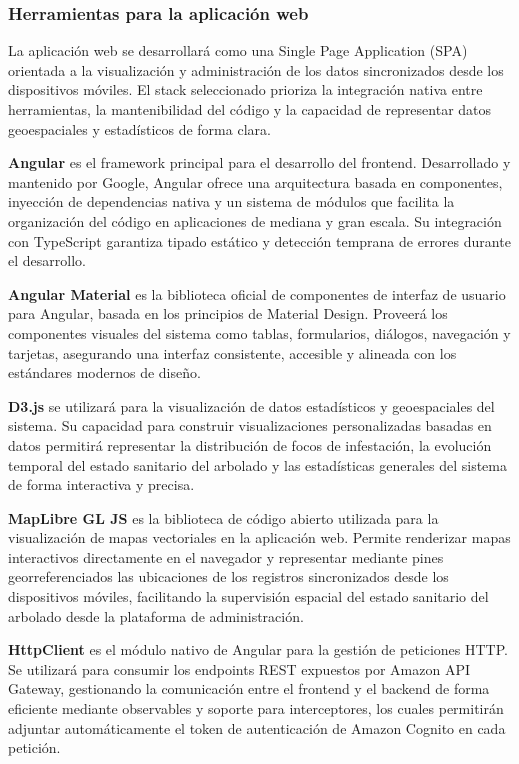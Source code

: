 \newpage
\subsubsection{Herramientas para la aplicación web}

La aplicación web se desarrollará como una Single Page Application
(SPA) orientada a la visualización y administración de los datos
sincronizados desde los dispositivos móviles. El stack seleccionado
prioriza la integración nativa entre herramientas, la mantenibilidad
del código y la capacidad de representar datos geoespaciales y
estadísticos de forma clara.

\textbf{Angular} es el framework principal para el desarrollo del
frontend. Desarrollado y mantenido por Google, Angular ofrece una
arquitectura basada en componentes, inyección de dependencias nativa
y un sistema de módulos que facilita la organización del código en
aplicaciones de mediana y gran escala. Su integración con TypeScript
garantiza tipado estático y detección temprana de errores durante
el desarrollo.

\textbf{Angular Material} es la biblioteca oficial de componentes
de interfaz de usuario para Angular, basada en los principios de
Material Design. Proveerá los componentes visuales del sistema como
tablas, formularios, diálogos, navegación y tarjetas, asegurando
una interfaz consistente, accesible y alineada con los estándares
modernos de diseño.

\textbf{D3.js} se utilizará para la visualización de datos estadísticos y geoespaciales del sistema. Su capacidad para construir visualizaciones personalizadas basadas en datos permitirá representar la distribución de focos de infestación, la evolución temporal del estado sanitario del arbolado y las estadísticas generales del sistema de forma interactiva y precisa.

\textbf{MapLibre GL JS} es la biblioteca de código abierto utilizada
para la visualización de mapas vectoriales en la aplicación web.
Permite renderizar mapas interactivos directamente en el navegador
y representar mediante pines georreferenciados las ubicaciones de
los registros sincronizados desde los dispositivos móviles, facilitando la supervisión espacial del estado sanitario del arbolado desde la plataforma de administración.

\textbf{HttpClient} es el módulo nativo de Angular para la gestión
de peticiones HTTP. Se utilizará para consumir los endpoints REST
expuestos por Amazon API Gateway, gestionando la comunicación entre
el frontend y el backend de forma eficiente mediante observables y
soporte para interceptores, los cuales permitirán adjuntar
automáticamente el token de autenticación de Amazon Cognito en cada
petición.

